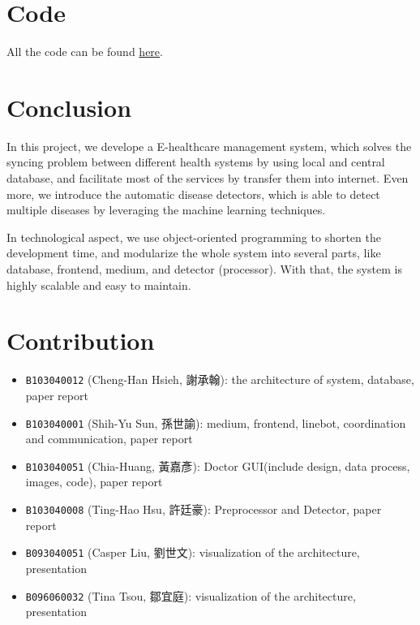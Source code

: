 \documentclass{article}
\begin{document}
\section{Code}
\label{sec:code}
All the code can be found \href{https://github.com/OEmiliatanO/E-health}{here}.

\section{Conclusion}
\label{sec:conclusion}
In this project, we develope a E-healthcare management system, which solves 
the syncing problem between different health systems by using local and 
central database, and facilitate most of the services by transfer them into 
internet. Even more, we introduce the automatic disease detectors, which 
is able to detect multiple diseases by leveraging the machine learning 
techniques. 

In technological aspect, we use object-oriented programming to shorten the 
development time, and modularize the whole system into several parts, like 
database, frontend, medium, and detector (processor). With that, the system 
is highly scalable and easy to maintain. 
\newpage
\section{Contribution}
\label{sec:contribution}

\begin{itemize}
  \item \texttt{B103040012} (Cheng-Han Hsieh, 謝承翰): the architecture of system, database, paper report
  \item \texttt{B103040001} (Shih-Yu Sun, 孫世諭): medium, frontend, linebot, coordination and communication, paper report
  \item \texttt{B103040051} (Chia-Huang, 黃嘉彥): Doctor GUI(include design, data process, images, code), paper report
  \item \texttt{B103040008} (Ting-Hao Hsu, 許廷豪): Preprocessor and Detector, paper report
  \item \texttt{B093040051} (Casper Liu, 劉世文): visualization of the architecture, presentation
  \item \texttt{B096060032} (Tina Tsou, 鄒宜庭): visualization of the architecture, presentation
\end{itemize}
\end{document}

